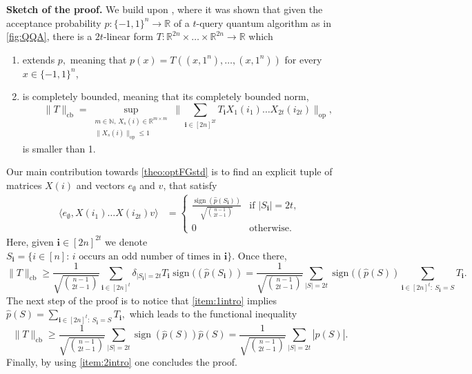 \documentclass[11pt]{article}
\DeclareMathOperator{\cb}{cb}
\DeclareMathOperator{\op}{op}
\newcommand{\norm}[1]{\|#1\|}
\newcommand{\R}{\mathbb{R}} %
\newcommand{\N}{\mathbb{N}} %
\newcommand{\1}{\mathbf{1}}
\DeclareMathOperator{\sign}{sign}
\newcommand{\ind}[1]{\mathbf{#1}}
\theoremstyle{plain}
\theoremstyle{definition}
\theoremstyle{remark}
\begin{document}
\noindent\textbf{Sketch of the proof.} We build upon \cite{QQA=CBF}, where it was shown that given the acceptance probability $p:\{-1,1\}^n\to \R$ of a $t$-query quantum algorithm as in \cref{fig:QQA}, there is a $2t$-linear form $T:\mathbb R^{2n}\times\dots\times\R^{2n}\to \R$ which
    \begin{enumerate}
        \item extends $p,$ meaning that $p(x)=T((x,1^n), \dots,(x,1^n))$  for every $x\in\{-1,1\}^n$, \label{item:1intro}
        \item is completely bounded, meaning that its completely bounded norm, $$ \norm{T}_{\cb}=\sup_{\substack{m\in\N,\, X_s(i)\in\R^{m\times m}\\ \norm{X_s(i)}_{\op}\leq 1}}\norm{\sum_{\ind i\in [2n]^{2t}}T_{\ind i}X_1(i_1)\dots X_{2t}(i_{2t})}_{\mathrm{op}},$$
        is smaller than 1.\label{item:2intro}
    \end{enumerate}
Our main contribution towards \cref{theo:optFGstd} is to find an explicit tuple of matrices $X(i)$ and vectors $e_\emptyset$ and $v$, that satisfy 
\begin{align}
        \langle e_\emptyset, X(i_1)\dots X(i_{2t}) v\rangle&=\left\{\begin{array}{ll}
           \frac{\sign{(\widehat p (S_{\ind i}))}}{\sqrt{{n-1\choose 2t-1}}}  &  \text{if } |S_\ind i|=2t,\\
           0  & \text{otherwise}.
        \end{array}\right.\label{eq:keyeqFG}
\end{align}
Here, given $\ind i\in [2n]^{2t}$ we denote $S_\ind i=\{i\in [n]:\, i \text{ occurs an odd number of times in }\ind i\}.$ Once there,
\begin{equation*}
    \norm{T}_{\cb}\geq \frac{1}{\sqrt{{n-1\choose 2t-1}}}\sum_{\ind i\in [2n]^t}\delta_{|S_\ind i|=2t}T_{\ind i}\sign((\widehat p(S_\ind i))=\frac{1}{\sqrt{{n-1\choose 2t-1}}}\sum_{|S|=2t}\sign((\widehat p(S))\sum_{\ind i\in [2n]^t:\ S_\ind i=S}T_{\ind i}.
\end{equation*}
The next step of the proof is to notice that \cref{item:1intro} implies $\widehat p(S)=\sum_{\ind i\in [2n]^t:\ S_\ind i=S}T_{\ind i},$ which leads to the functional inequality
\begin{equation*}
    \norm{T}_{\cb}\geq \frac{1}{\sqrt{{n-1\choose 2t-1}}}\sum_{|S|=2t}\sign (\widehat p(S)) \widehat p(S)=\frac{1}{\sqrt{{n-1\choose 2t-1}}}\sum_{|S|=2t} |\widehat p(S)|.
\end{equation*}
Finally, by using \cref{item:2intro} one concludes the proof.
\end{document}
